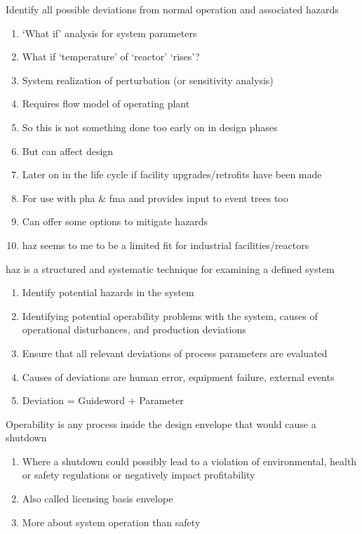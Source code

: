 \documentclass[aspectratio=1610,pdftex,dvipsnames,compress,xcolor={dvipsnames}]{beamer}
\newcommand{\acs}{\acrshort} %
\begin{document}
\begin{frame}{Identify all possible deviations from normal operation and associated hazards}
    \begin{enumerate}[series=outerlist,topsep=0pt,itemsep=7pt,leftmargin=*,label=(\arabic*)]
        \item[]`What if' analysis for system parameters  
        \item[]What if `temperature' of `reactor' `rises'?
        \item[]System realization of perturbation (or sensitivity analysis)
        \item[]Requires flow model of operating plant  
        \item[]So this is not something done too early on in design phases  
        \item[]But can affect design  
        \item[]Later on in the life cycle if facility upgrades/retrofits have been made  
        \item[]For use with \acs{pha} \& \acs{fma} and provides input to event trees too  
        \item[]Can offer some options to mitigate hazards
        \item[]\acs{haz} seems to me to be a limited fit for industrial facilities/reactors
    \end{enumerate}
\end{frame}


\begin{frame}{\acs{haz} is a structured and systematic technique for examining a defined system}
    \begin{enumerate}[series=outerlist,topsep=0pt,itemsep=21pt,leftmargin=*,label=(\arabic*)]
        \item[]Identify potential hazards in the system  
        \item[]Identifying potential operability problems with the system, causes of operational disturbances, and production deviations
        \item[]Ensure that all relevant deviations of process parameters are evaluated  
        \item[]Causes of deviations are human error, equipment failure, external events
        \item[]Deviation = Guideword + Parameter
    \end{enumerate}
\end{frame}


\begin{frame}{Operability is any process inside the design envelope that would cause a shutdown}
    \begin{enumerate}[series=outerlist,topsep=0pt,itemsep=21pt,leftmargin=*,label=(\arabic*)]
        \item[]Where a shutdown could possibly lead to a violation of environmental, health or safety regulations or negatively impact profitability
        \item[]Also called licensing basis envelope
        \item[]More about system operation than safety
    \end{enumerate}
\end{frame}
\end{document}
